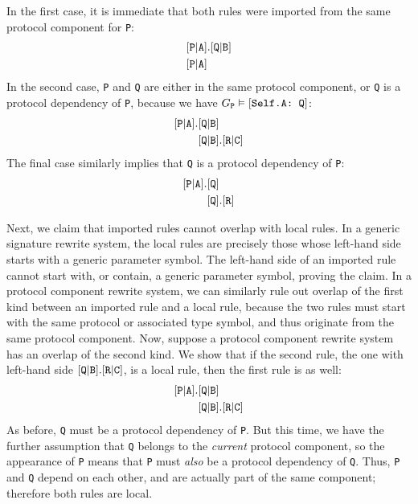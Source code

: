 \documentclass[../generics]{subfiles}
\begin{document}
In the first case, it is immediate that both rules were imported from the same protocol component for \texttt{P}:
\begin{align*}
&[\texttt{P}|\texttt{A}].[\texttt{Q}|\texttt{B}]\\
&[\texttt{P}|\texttt{A}]
\end{align*}
In the second case, \texttt{P} and \texttt{Q} are either in the same protocol component, or \texttt{Q} is a protocol dependency of \texttt{P}, because we have $G_{\texttt{P}}\vDash[\texttt{Self.A:~Q}]$:
\begin{align*}
[\texttt{P}|\texttt{A}].&[\texttt{Q}|\texttt{B}]\\
&[\texttt{Q}|\texttt{B}].[\texttt{R}|\texttt{C}]
\end{align*}
The final case similarly implies that \texttt{Q} is a protocol dependency of \texttt{P}:
\begin{align*}
[\texttt{P}|\texttt{A}].&[\texttt{Q}]\\
&[\texttt{Q}].[\texttt{R}]
\end{align*}

Next, we claim that imported rules cannot overlap with local rules. In a generic signature rewrite system, the local rules are precisely those whose left-hand side starts with a generic parameter symbol. The left-hand side of an imported rule cannot start with, or contain, a generic parameter symbol, proving the claim. In a protocol component rewrite system, we can similarly rule out overlap of the first kind between an imported rule and a local rule, because the two rules must start with the same protocol or associated type symbol, and thus originate from the same protocol component. Now, suppose a protocol component rewrite system has an overlap of the second kind. We show that if the second rule, the one with left-hand side $[\texttt{Q}|\texttt{B}].[\texttt{R}|\texttt{C}]$, is a local rule, then the first rule is as well:
\begin{align*}
[\texttt{P}|\texttt{A}].&[\texttt{Q}|\texttt{B}]\\
&[\texttt{Q}|\texttt{B}].[\texttt{R}|\texttt{C}]
\end{align*}
As before, \texttt{Q} must be a protocol dependency of \texttt{P}. But this time, we have the further assumption that \texttt{Q} belongs to the \emph{current} protocol component, so the appearance of \texttt{P} means that \texttt{P} must \emph{also} be a protocol dependency of \texttt{Q}. Thus, \texttt{P} and \texttt{Q} depend on each other, and are actually part of the same component; therefore both rules are local.
\end{document}
